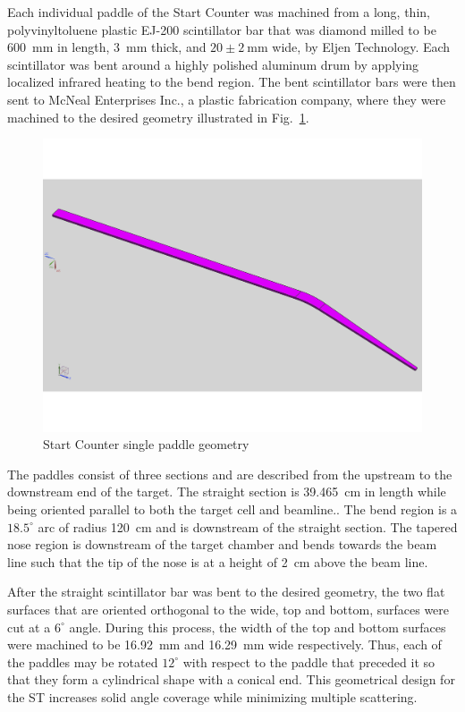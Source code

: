 Each individual paddle of the Start Counter was machined from a long, thin, polyvinyltoluene plastic EJ-200 scintillator bar that was diamond milled to be 600~mm in length, 3~mm thick, and $\mathrm{20 \pm 2\ mm}$ wide, by Eljen Technology.  Each scintillator was bent around a highly polished aluminum drum by applying localized infrared heating to the bend region.  The bent scintillator bars were then sent to McNeal Enterprises Inc.\cite{mcneal}, a plastic fabrication company, where they were machined to the desired geometry illustrated in Fig.~\ref{fig:stpaddleiso}.
	\begin{figure}[!htb]
		\centering
		\includegraphics[width=1.0\columnwidth]{design/figs/st_paddle_iso}
		\caption{Start Counter single paddle geometry}
		\label{fig:stpaddleiso}
	\end{figure}

The paddles consist of three sections and are described from the upstream to the downstream end of the target.  The straight section is 39.465~cm in length while being oriented parallel to both the target cell and beamline..  The bend region is a $18.5^{\circ}$ arc of radius 120~cm and is downstream of the straight section. The tapered nose region is downstream of the target chamber and bends towards the beam line such that the tip of the nose is at a height of 2~cm above the beam line.  

After the straight scintillator bar was bent to the desired geometry, the two flat surfaces that are oriented orthogonal to the wide, top and bottom, surfaces were cut at a $6^{\circ}$ angle.  During this process, the width of the top and bottom surfaces were machined to be 16.92~mm and 16.29~mm wide respectively.  Thus, each of the paddles may be rotated $12^{\circ}$ with respect to the paddle that preceded it so that they form a cylindrical shape with a conical end.  This geometrical design for the ST increases solid angle coverage while minimizing multiple scattering.  

